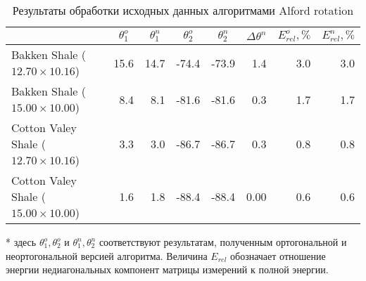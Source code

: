 \documentclass[a4paper,11pt]{article}
\begin{document}
\begin{table}[h]
\footnotesize
\caption{Результаты обработки исходных данных алгоритмами Alford rotation}
\renewcommand{\arraystretch}{1.5}
\begin{tabularx}{\textwidth}{|X|rr|rr|r|rr|}
\hline	
				&\multicolumn{1}{c}{$\theta_1^o$} & \multicolumn{1}{c|}{$\theta_1^n$} & \multicolumn{1}{c}{$\theta_2^o$} & \multicolumn{1}{c|}{$\theta_2^n$} & \multicolumn{1}{c|}{$\Delta\theta^n$}& \multicolumn{1}{c}{$E_{rel}^o, \%$} & \multicolumn{1}{c|}{$E_{rel}^n, \%$} \\ \hline
\hline Bakken Shale ($12.70 \times 10.16$) & 15.6 & 14.7 & -74.4 & -73.9  & 1.4  & 3.0 & 3.0 \\
\hline Bakken Shale ($15.00 \times 10.00$) & 8.4 & 8.1 & -81.6 & -81.6 & 0.3 & 1.7 & 1.7 \\
\hline Cotton Valey Shale ($12.70 \times 10.16$) & 3.3 & 3.0 & -86.7 & -86.7  & 0.3 & 0.8 & 0.8 \\ 
\hline Cotton Valey Shale ($15.00 \times 10.00$) & 1.6 & 1.8 & -88.4 & -88.4  & 0.00  & 0.6 & 0.6 \\	   
 	   \hline
\end{tabularx} 
\begin{flushleft}
* здесь $\theta_1^o,\theta_2^o$ и $\theta_1^n,\theta_2^n$ соответствуют результатам, полученным ортогональной и неортогональной версией алгоритма. Величина $E_{rel}$ обозначает отношение энергии недиагональных компонент матрицы измерений к полной энергии.
\end{flushleft}
\label{tab:std_process_results}
\renewcommand{\arraystretch}{1.0}
\end{table}
\end{document}
